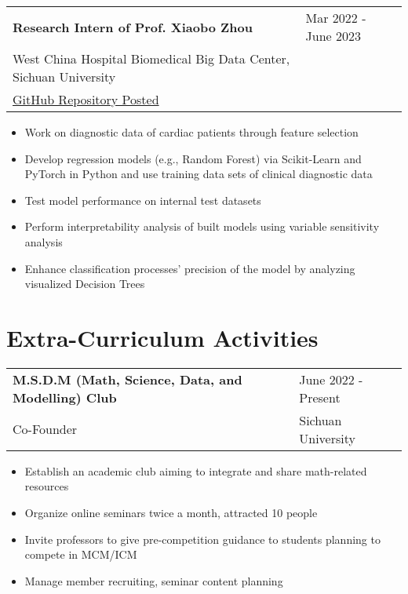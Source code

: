 \documentclass[letter,12pt]{article}
\begin{document}
\begin{tabularx}{\linewidth}{@{}l X@{}}
\large \textbf{Research Intern of Prof. Xiaobo Zhou} & \hfill {Mar 2022 - June 2023} \\
\small{West China Hospital Biomedical Big Data Center, Sichuan University} & \hfill {} \\
\small{\href{https://github.com/Robin0265/HeartDisease_Regression}{GitHub Repository Posted}} & \hfill {} \\
\end{tabularx}

\begin{itemize}[
    rightmargin=2cm
]
    \setlength{\itemsep}{1pt}
    \setlength{\parskip}{0pt}
    \setlength{\parsep}{0pt}
    \item{\small Work on diagnostic data of cardiac patients through feature selection}
    \item{\small Develop regression models (e.g., Random Forest) via Scikit-Learn and PyTorch in Python and use training data sets of clinical diagnostic data}
    \item{\small Test model performance on internal test datasets}
    \item{\small Perform interpretability analysis of built models using variable sensitivity analysis}
    \item{\small Enhance classification processes' precision of the model by analyzing visualized Decision Trees}
\end{itemize}


\section{Extra-Curriculum Activities}

\begin{tabularx}{\linewidth}{@{}l X@{}}
\large \textbf{M.S.D.M (Math, Science, Data, and Modelling) Club} & \hfill {June 2022 - Present} \\
\normalsize{Co-Founder} & \hfill \small{Sichuan University} \\
\end{tabularx}

\begin{itemize}[
    rightmargin=2cm
]
    \setlength{\itemsep}{1pt}
    \setlength{\parskip}{0pt}
    \setlength{\parsep}{0pt}
    \item{\small Establish an academic club aiming to integrate and share math-related resources}
    \item{\small Organize online seminars twice a month, attracted 10 people}
    \item{\small Invite professors to give pre-competition guidance to students planning to compete in MCM/ICM}
    \item{\small Manage member recruiting, seminar content planning}
\end{itemize}
\end{document}
